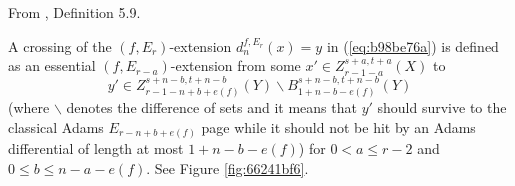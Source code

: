 
\begin{definition}
\label{paper:5.9}
From \cite{LWX126}, Definition 5.9.\par
\label{def:41d51149}
    A crossing of the $(f,E_r)$-extension $d_{n}^{f,E_r}(x)=y$ in (\ref{eq:b98be76a}) is defined as an essential $(f, E_{r-a})$-extension from some $x'\in Z_{r-1-a}^{s+a,t+a}(X)$ to 
    $$y'\in Z_{r-1-n+b+e(f)}^{s+n-b,t+n-b}(Y)\backslash B_{1+n-b-e(f)}^{s+n-b,t+n-b}(Y)$$
    (where $\backslash$ denotes the difference of sets and it means that $y'$ should survive to the classical Adams $E_{r-n+b+e(f)}$ page while it should not be hit by an Adams differential of length at most $1+n-b-e(f)$) for $0<a \le r-2$ and $0\le b\le n-a-e(f)$. See Figure \ref{fig:66241bf6}.


\end{definition}


